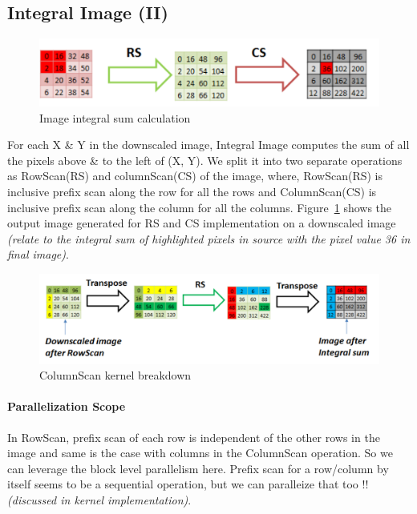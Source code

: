 \subsection{Integral Image (II)}\label{sec:II}

\begin{figure}[h]
  \centering
  \includegraphics[width=\linewidth]{figs/ii_img_crop.pdf}
  \caption{Image integral sum calculation }
  \label{fig:II}
\end{figure}

For each X  \& Y in the downscaled image, Integral Image computes 
the sum of all the pixels above \& to the left of (X, Y).  We split 
it into two separate operations as RowScan(RS) and columnScan(CS) of the 
image, where, RowScan(RS) is inclusive prefix scan along the row for all 
the rows and ColumnScan(CS) is inclusive prefix scan along the column for all the columns.
Figure~\ref{fig:II} shows the output image generated for RS and CS implementation 
on a downscaled image
\textit{(relate to the integral sum of highlighted pixels in source with the pixel value 36 in final image)}.


\begin{figure}[h]
  \centering
  \includegraphics[width=0.85\linewidth]{figs/cs_break_crop.pdf}
  \caption{ColumnScan kernel breakdown }
  \label{fig:cs_brkdwn }
\end{figure}

\paragraph{Parallelization Scope}
In RowScan, prefix scan of each row is independent of the other rows 
in the image and same is the case with columns in the ColumnScan operation. 
So we can leverage the block level parallelism here. Prefix scan for a row/column  
by itself seems to be a sequential operation, but we can paralleize that too !!
\textit{(discussed in kernel implementation)}.


